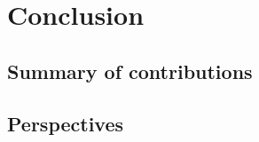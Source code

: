 \chapter{Conclusion}
\label{chap:conclusion}

\section{Summary of contributions}



\section{Perspectives}

